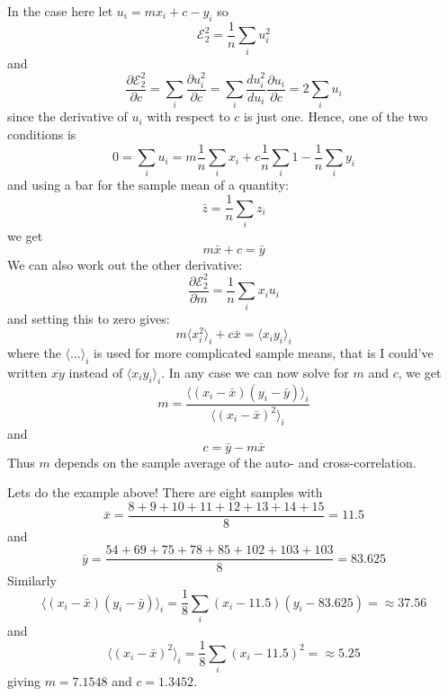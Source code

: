 \documentclass[12pt]{article}
\begin{document}
In the case here let $u_i=mx_i+c-y_i$ so
\begin{equation}
\mathcal{E}_2^2=\frac{1}{n}\sum_iu_i^2
\end{equation}
and
\begin{equation}
\frac{\partial \mathcal{E}_2^2}{\partial c}=\sum_i\frac{\partial u_i^2}{\partial c}=\sum_i\frac{d u_i^2}{du_i}\frac{\partial u_i}{\partial c}=2\sum_i u_i
\end{equation}
since the derivative of $u_i$ with respect to $c$ is just one. Hence,
one of the two conditions is
\begin{equation}
0=\sum_i u_i = m\frac{1}{n}\sum_i x_i + c\frac{1}{n}\sum_i 1-\frac{1}{n}\sum_i y_i
\end{equation}
and using a bar for the sample mean of a quantity:
\begin{equation}
\bar{z}=\frac{1}{n}\sum_i z_i
\end{equation}
we get
\begin{equation}
m\bar{x}+c=\bar{y}
\end{equation}
We can also work out the other derivative:
\begin{equation}
\frac{\partial \mathcal{E}_2^2}{\partial m}=\frac{1}{n}\sum_i x_iu_i
\end{equation}
and setting this to zero gives:
\begin{equation}
 m\langle x_i^2\rangle_i +c\bar{x}=\langle x_iy_i\rangle_i
\end{equation}
where the $\langle\ldots\rangle_i$ is used for more complicated sample
means, that is I could've written $\overline{xy}$ instead of $\langle
x_iy_i\rangle_i$. In any case we can now solve for $m$ and $c$, we get
\begin{equation}
m=\frac{\langle (x_i-\bar{x})(y_i-\bar{y})\rangle_i}{\langle (x_i-\bar{x})^2\rangle_i}
\end{equation}
and
\begin{equation}
c=\bar{y}-m\bar{x}
\end{equation}
Thus $m$ depends on the sample average of the auto- and cross-correlation.

Lets do the example above! There are eight samples with
\begin{equation}
\bar{x}=\frac{8+9+10+11+12+13+14+15}{8}=11.5
\end{equation}
and
\begin{equation}
\bar{y}=\frac{54 + 69 + 75 + 78 + 85 + 102 + 103 + 103}{8}=83.625
\end{equation}
Similarly
\begin{equation}
\langle (x_i-\bar{x})(y_i-\bar{y})\rangle_i=\frac{1}{8}\sum_i(x_i-11.5)(y_i-83.625)=\approx 37.56
\end{equation}
and
\begin{equation}
\langle (x_i-\bar{x})^2\rangle_i=\frac{1}{8}\sum_i(x_i-11.5)^2=\approx 5.25
\end{equation}
giving $m=7.1548$ and $c=1.3452$.
\end{document}
